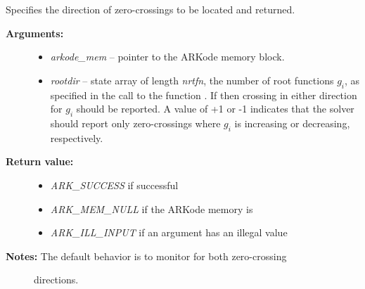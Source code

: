 \documentclass[letterpaper,10pt,english]{sphinxmanual}
\begin{document}
\begin{fulllineitems}
\label{c_interface/User_callable:ARKodeSetRootDirection}
Specifies the direction of zero-crossings to be located and returned.
\begin{description}
\item[{\textbf{Arguments:}}] \leavevmode\begin{itemize}
\item {} 
\emph{arkode\_mem} -- pointer to the ARKode memory block.

\item {} 
\emph{rootdir} -- state array of length \emph{nrtfn}, the number of root
functions $g_i$, as specified in the call to the function
{\hyperref[c_interface/User_callable:ARKodeRootInit]{}}.  If  then
crossing in either direction for $g_i$ should be
reported.  A value of +1 or -1 indicates that the solver
should report only zero-crossings where $g_i$ is
increasing or decreasing, respectively.

\end{itemize}

\item[{\textbf{Return value:}}] \leavevmode\begin{itemize}
\item {} 
\emph{ARK\_SUCCESS} if successful

\item {} 
\emph{ARK\_MEM\_NULL} if the ARKode memory is 

\item {} 
\emph{ARK\_ILL\_INPUT} if an argument has an illegal value

\end{itemize}

\item[{\textbf{Notes:} The default behavior is to monitor for both zero-crossing}] \leavevmode
directions.

\end{description}

\end{fulllineitems}

\end{document}
